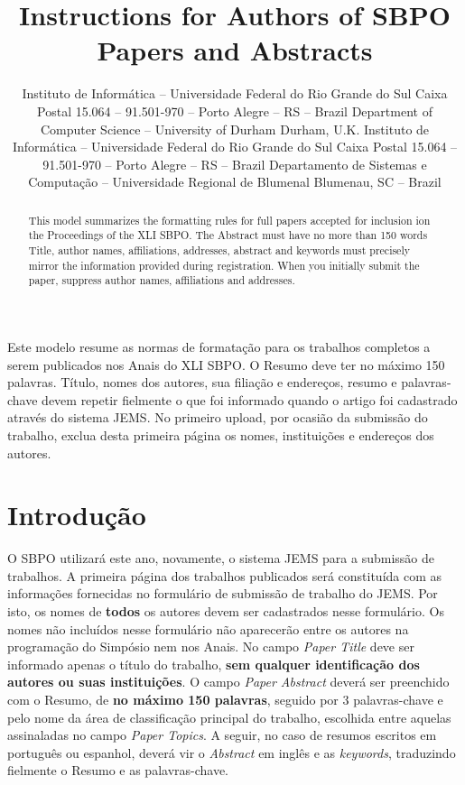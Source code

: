 \documentclass[11pt]{article}
\title{Instructions for Authors of SBPO\\ Papers and Abstracts}
\author{\sbpoauthor{Luciana P. Nedel}
                   {Instituto de Informática -- Universidade Federal do Rio Grande do Sul}
                   {Caixa Postal 15.064 -- 91.501-970 -- Porto Alegre -- RS -- Brazil}
                   {\email{nedel@inf.ufrgs.br}}
        \sbpoauthor{Rafael H. Bordini}
                   {Department of Computer Science -- University of Durham}
                   {Durham, U.K.}
                   {\email{R.Bordini@durham.ac.uk}}
        \sbpoauthor{Flávio Rech}
                   {Instituto de Informática -- Universidade Federal do Rio Grande do Sul}
                   {Caixa Postal 15.064 -- 91.501-970 -- Porto Alegre -- RS -- Brazil}
                   {\email{flavio@inf.ufrgs.br}}
        \sbpoauthor{Jomi F. Hübner}
                   {Departamento de Sistemas e Computação -- Universidade Regional de Blumenal}
                   {Blumenau, SC -- Brazil}
                   {\email{jomi@inf.furb.br}}}
\begin{document}
 

\maketitle


\begin{resumo} 
  Este modelo resume as normas de formatação para os trabalhos completos a serem publicados nos Anais do XLI SBPO. O Resumo deve ter no máximo 150 palavras. Título, nomes dos autores, sua filiação e endereços, resumo e palavras-chave devem repetir fielmente o que foi informado quando o artigo foi cadastrado através do sistema JEMS. No primeiro upload, por ocasião da submissão do trabalho, exclua desta primeira página os nomes, instituições e endereços dos autores.
\end{resumo}


\begin{abstract}
  This model summarizes the formatting rules for full papers accepted for inclusion ion the Proceedings of the XLI SBPO. The Abstract must have no more than 150 words Title, author names, affiliations, addresses, abstract and keywords must precisely mirror the information provided during registration. When you initially submit the paper, suppress author names, affiliations and addresses.
\end{abstract}

\newpage
 
\section{Introdução}

O SBPO utilizará este ano, novamente, o sistema JEMS para a submissão de trabalhos. A primeira página dos trabalhos publicados será constituída com as informações fornecidas no formulário de submissão de trabalho do JEMS. Por isto, os nomes de \textbf{todos} os autores devem ser cadastrados nesse formulário. Os nomes  não incluídos nesse formulário não aparecerão entre os autores na programação do Simpósio nem nos Anais.
No campo \textit{Paper Title }deve ser informado apenas o título do trabalho, \textbf{sem qualquer identificação dos autores ou suas instituições}. 
O campo \textit{Paper Abstract} deverá ser preenchido com o Resumo, de \textbf{no máximo 150 palavras}, seguido por 3 palavras-chave e pelo nome da área de classificação principal do trabalho, escolhida entre aquelas assinaladas no campo \textit{Paper Topics}. A seguir, no caso de resumos escritos em português ou espanhol, deverá vir o \textit{Abstract} em inglês e as \textit{keywords}, traduzindo fielmente o Resumo e as palavras-chave. 
\end{document}
